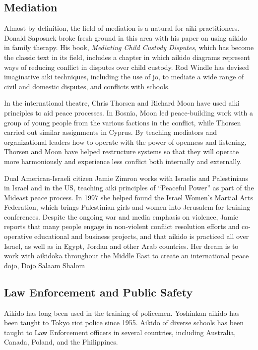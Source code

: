 \subsection*{Mediation}

Almost by definition, the field of mediation is a natural for aiki practitioners. Donald Saposnek broke fresh ground in this area with his paper on using aikido in family therapy. His book, \emph{Mediating Child Custody Disputes}, which has become the classic text in its field, includes a chapter in which aikido diagrams represent ways of reducing conflict in disputes over child custody. Rod Windle has devised imaginative aiki techniques, including the use of jo, to mediate a wide range of civil and domestic disputes, and conflicts with schools.

In the international theatre, Chris Thorsen and Richard Moon have used aiki principles to aid peace processes. In Bosnia, Moon led peace-building work with a group of young people from the various factions in the conflict, while Thorsen carried out similar assignments in Cyprus. By teaching mediators and organizational leaders how to operate with the power of openness and listening, Thorsen and Moon have helped restructure systems so that they will operate more harmoniously and experience less conflict both internally and externally.

Dual American-Israeli citizen Jamie Zimron works with Israelis and Palestinians in Israel and in the US, teaching aiki principles of ``Peaceful Power'' as part of the Mideast peace process. In 1997 she helped found the Israel Women's Martial Arts Federation, which brings Palestinian girls and women into Jerusalem for training conferences. Despite the ongoing war and media emphasis on violence, Jamie reports that many people engage in non-violent conflict resolution efforts and co-operative educational and business projects, and that aikido is practiced all over Israel, as well as in Egypt, Jordan and other Arab countries. Her dream is to work with aikidoka throughout the Middle East to create an international peace dojo, Dojo Salaam Shalom

\subsection*{Law Enforcement and Public Safety}

Aikido has long been used in the training of policemen. Yoshinkan aikido has been taught to Tokyo riot police since 1955. Aikido of diverse schools has been taught to Law Enforcement officers in several countries, including Australia, Canada, Poland, and the Philippines. 


